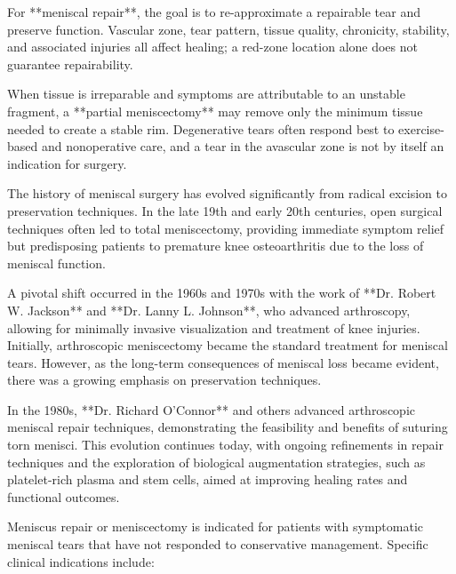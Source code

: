 For **meniscal repair**, the goal is to re-approximate a repairable tear and preserve function. Vascular zone, tear pattern, tissue quality, chronicity, stability, and associated injuries all affect healing; a red-zone location alone does not guarantee repairability.

When tissue is irreparable and symptoms are attributable to an unstable fragment, a **partial meniscectomy** may remove only the minimum tissue needed to create a stable rim. Degenerative tears often respond best to exercise-based and nonoperative care, and a tear in the avascular zone is not by itself an indication for surgery.

The history of meniscal surgery has evolved significantly from radical excision to preservation techniques. In the late 19th and early 20th centuries, open surgical techniques often led to total meniscectomy, providing immediate symptom relief but predisposing patients to premature knee osteoarthritis due to the loss of meniscal function.

A pivotal shift occurred in the 1960s and 1970s with the work of **Dr. Robert W. Jackson** and **Dr. Lanny L. Johnson**, who advanced arthroscopy, allowing for minimally invasive visualization and treatment of knee injuries. Initially, arthroscopic meniscectomy became the standard treatment for meniscal tears. However, as the long-term consequences of meniscal loss became evident, there was a growing emphasis on preservation techniques.

In the 1980s, **Dr. Richard O'Connor** and others advanced arthroscopic meniscal repair techniques, demonstrating the feasibility and benefits of suturing torn menisci. This evolution continues today, with ongoing refinements in repair techniques and the exploration of biological augmentation strategies, such as platelet-rich plasma and stem cells, aimed at improving healing rates and functional outcomes.

Meniscus repair or meniscectomy is indicated for patients with symptomatic meniscal tears that have not responded to conservative management. Specific clinical indications include:

